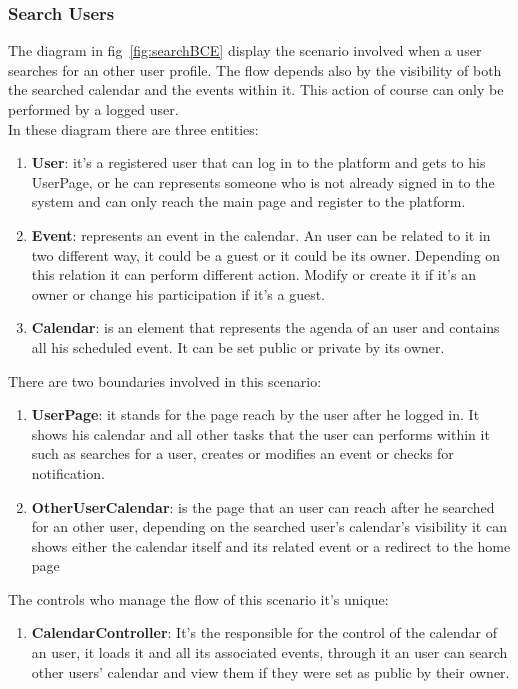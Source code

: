 \subsubsection{Search Users}
The diagram in fig~\ref{fig:searchBCE} display the scenario involved when a user searches for an other user profile. The flow depends also by the visibility of both the searched calendar and the events within it. This action of course can only be performed by a logged user.\\
In these diagram there are three entities:
\begin{enumerate}
\item  {\bf User}: it's a registered user that can log in to the platform and gets to his UserPage, or he can  represents someone who is not already signed in  to the system and can only reach the main page and register to the platform.
\item  {\bf Event}: represents an event in the calendar. An user can be related to it in two different way, it could be a guest or it could be its owner. Depending on this relation it can perform different action. Modify or create it if it's an owner or change his participation if it's a guest.
\item {\bf Calendar}: is an element that represents the agenda of an user and contains all his scheduled event. It can be set public or private by its owner.
\end{enumerate}
There are two boundaries involved in this scenario: \begin{enumerate}
\item {\bf UserPage}: it stands for the page reach by the user after he logged in. It shows his calendar and all other tasks that the user can performs within it such as searches for a user, creates or modifies an event or checks for notification.
 \item {\bf OtherUserCalendar}: is the page that an user can reach after he searched for an other user, depending on the searched user's calendar's visibility it can shows either the calendar itself and its related event or a redirect to the home page
 \end{enumerate}
The controls who manage the flow of this scenario it's unique:\begin{enumerate}
\item  {\bf CalendarController}: It's the responsible for the control of the calendar of an user, it loads it and all its associated events, through it an user can search other users' calendar and view them if they were set as public by their owner.\end{enumerate}

